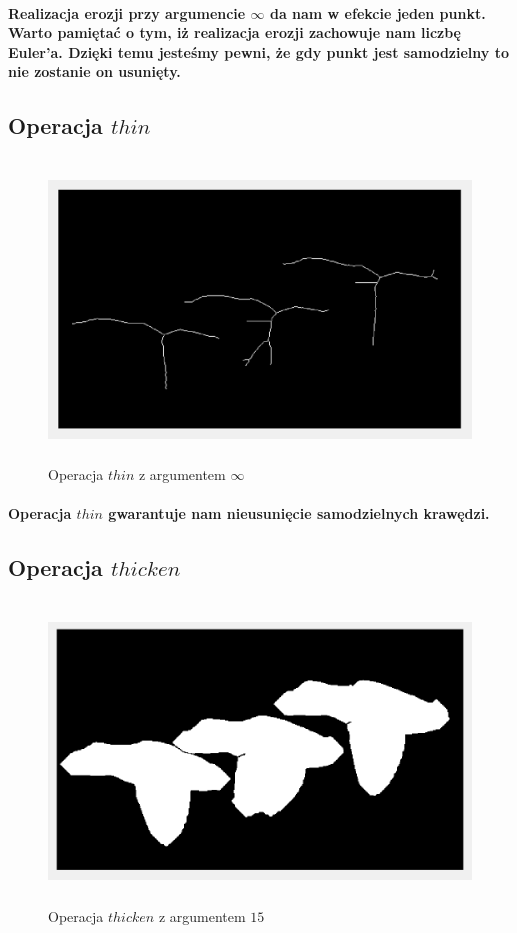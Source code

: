 \documentclass[a4paper,12pt]{article}
\begin{document}
\begin{justify}
\paragraph{Realizacja erozji przy argumencie $\infty$ da nam w efekcie jeden punkt. Warto pamiętać o tym, iż realizacja erozji zachowuje nam liczbę Euler'a. Dzięki temu jesteśmy pewni, że gdy punkt jest samodzielny to nie zostanie on usunięty. }

\newpage

\subsection{Operacja $thin$}

\begin{figure}[h]
\centering
\includegraphics[width=12cm, height=8cm]{4}
\caption{Operacja $thin$ z argumentem $\infty$}
\end{figure}

\paragraph{Operacja $thin$ gwarantuje nam nieusunięcie samodzielnych krawędzi.}

\subsection{Operacja $thicken$}

\begin{figure}[h]
\centering
\includegraphics[width=12cm, height=8cm]{5}
\caption{Operacja $thicken$ z argumentem $15$}
\end{figure}


\end{justify}
\end{document}
